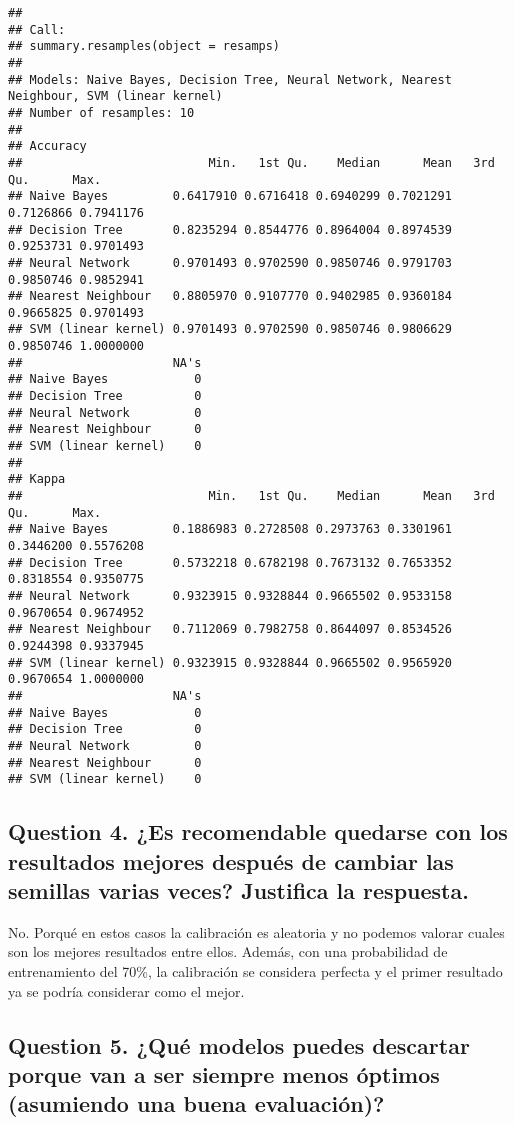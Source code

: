\documentclass[]{article}
\begin{document}
\begin{verbatim}
## 
## Call:
## summary.resamples(object = resamps)
## 
## Models: Naive Bayes, Decision Tree, Neural Network, Nearest Neighbour, SVM (linear kernel) 
## Number of resamples: 10 
## 
## Accuracy 
##                          Min.   1st Qu.    Median      Mean   3rd Qu.      Max.
## Naive Bayes         0.6417910 0.6716418 0.6940299 0.7021291 0.7126866 0.7941176
## Decision Tree       0.8235294 0.8544776 0.8964004 0.8974539 0.9253731 0.9701493
## Neural Network      0.9701493 0.9702590 0.9850746 0.9791703 0.9850746 0.9852941
## Nearest Neighbour   0.8805970 0.9107770 0.9402985 0.9360184 0.9665825 0.9701493
## SVM (linear kernel) 0.9701493 0.9702590 0.9850746 0.9806629 0.9850746 1.0000000
##                     NA's
## Naive Bayes            0
## Decision Tree          0
## Neural Network         0
## Nearest Neighbour      0
## SVM (linear kernel)    0
## 
## Kappa 
##                          Min.   1st Qu.    Median      Mean   3rd Qu.      Max.
## Naive Bayes         0.1886983 0.2728508 0.2973763 0.3301961 0.3446200 0.5576208
## Decision Tree       0.5732218 0.6782198 0.7673132 0.7653352 0.8318554 0.9350775
## Neural Network      0.9323915 0.9328844 0.9665502 0.9533158 0.9670654 0.9674952
## Nearest Neighbour   0.7112069 0.7982758 0.8644097 0.8534526 0.9244398 0.9337945
## SVM (linear kernel) 0.9323915 0.9328844 0.9665502 0.9565920 0.9670654 1.0000000
##                     NA's
## Naive Bayes            0
## Decision Tree          0
## Neural Network         0
## Nearest Neighbour      0
## SVM (linear kernel)    0
\end{verbatim}

\hypertarget{question-4}{%
	\subsection{Question 4. ¿Es recomendable quedarse con los resultados mejores después de cambiar las semillas varias veces? Justifica la respuesta.}\label{question-4}}

No. Porqué en estos casos la calibración es aleatoria y no podemos valorar cuales son los mejores resultados entre ellos. Además, con una probabilidad de entrenamiento del 70\%, la calibración se considera perfecta y el primer resultado ya se podría considerar como el mejor.

\hypertarget{question-5}{%
	\subsection{Question 5. ¿Qué modelos puedes descartar porque van a ser siempre menos óptimos (asumiendo una buena evaluación)?}\label{question-5}}
\end{document}
